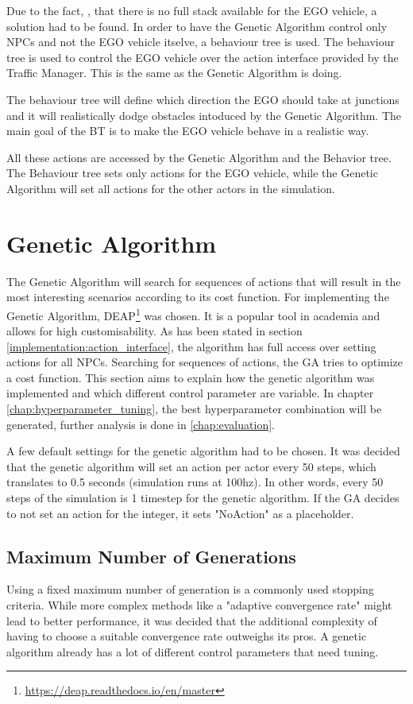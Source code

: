 Due to the fact, , that there is no full stack available for the EGO vehicle, a solution had to be found.
In order to have the Genetic Algorithm control only NPCs and not the EGO vehicle itselve, a behaviour tree is used.
The behaviour tree is used to control the EGO vehicle over the action interface provided by the Traffic Manager. This is the same as the Genetic Algorithm is doing.

The behaviour tree will define which direction the EGO should take at junctions and it will realistically dodge obstacles intoduced by the Genetic Algorithm. The main goal of the BT is to make the EGO vehicle behave in a realistic way.

All these actions are accessed by the Genetic Algorithm and the Behavior tree. The Behaviour tree sets only actions for the EGO vehicle, while the Genetic Algorithm will set all actions for the other actors in the simulation.

\section{Genetic Algorithm}
The Genetic Algorithm will search for sequences of actions that will result in the most interesting scenarios according to its cost function.
For implementing the Genetic Algorithm, DEAP\footnote{\url{https://deap.readthedocs.io/en/master}} was chosen. It is a popular tool in academia and allows for high customisability.
As has been stated in section \ref{implementation:action_interface}, the algorithm has full access over setting actions for all NPCs. Searching for sequences of actions, the GA tries to optimize a cost function. This section aims to explain how the genetic algorithm was implemented and which different control parameter are variable. In chapter \ref{chap:hyperparameter_tuning}, the best hyperparameter combination will be generated, further analysis is done in \ref{chap:evaluation}.

A few default settings for the genetic algorithm had to be chosen. It was decided that the genetic algorithm will set an action per actor every 50 steps, which translates to 0.5 seconds (simulation runs at 100hz). In other words, every 50 steps of the simulation is 1 timestep for the genetic algorithm. If the GA decides to not set an action for the integer, it sets "NoAction" as a placeholder.

\subsection{Maximum Number of Generations}
Using a fixed maximum number of generation is a commonly used stopping criteria. While more complex methods like a "adaptive convergence rate" might lead to better performance, it was decided that the additional complexity of having to choose a suitable convergence rate outweighs its pros. A genetic algorithm already has a lot of different control parameters that need tuning.

